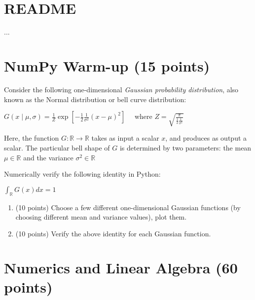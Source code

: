 \documentclass[10pt]{article}
\title{\documenttitle \vspace{1ex} \\ \Large \coursetitle \vspace{-1ex}}
\author{\authorname\vspace{-1ex}}
\begin{document}
\maketitle


\section{README}

... 

\section{NumPy Warm-up (15 points)}

Consider the following one-dimensional \textit{Gaussian probability distribution}, also known as the Normal distribution or bell curve distribution:

\begin{center}
$
G(x \mid \mu, \sigma)=\frac{1}{Z} \exp \left[-\frac{1}{2} \frac{1}{\sigma^{2}}(x-\mu)^{2}\right] \quad
$
where 
$
Z=\sqrt{\frac{\pi}{\frac{1}{2} \frac{1}{\sigma^{2}}}}
$
\end{center}

Here, the function $G : \mathbb{R} \rightarrow \mathbb{R}$ takes as input a scalar $x$, and produces as output a scalar. 
The particular bell shape of $G$ is determined by two parameters: the mean $\mu \in \mathbb{R}$ and the variance $\sigma^2 \in \mathbb{R}$

Numerically verify the following identity in Python:

\begin{center}
$\int_{\mathbb{R}} G(x) d x=1$
\end{center}

\begin{enumerate}[label=2.\arabic*]
    \item (10 points)
    Choose a few different one-dimensional Gaussian functions (by choosing different mean and variance values), plot them.
    \item (10 points)
    Verify the above identity for each Gaussian function. 
\end{enumerate}



\section{Numerics and Linear Algebra (60 points)}\label{sec:num_lin_alg}
\end{document}
